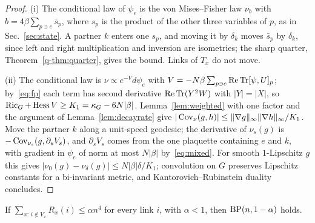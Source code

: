 \begin{proof}
(i) The conditional law of $\psi_e$ is the von Mises--Fisher law $\nu_b$ with
$b=4\beta\sum_{p\ni e}\bar s_p$, where $s_p$ is the product of the other three
variables of $p$, as in Sec.~\ref{sec:state}. A partner $k$ enters one
$s_p$, and moving it by $\delta_k$ moves $\bar s_p$ by $\delta_k$, since left and
right multiplication and inversion are isometries; the sharp quarter,
Theorem~\ref{q-thm:quarter}, gives the bound. Links of $T_x$ do not move.

(ii) The conditional law is $\nu\propto e^{-V}d\psi_e$ with $V=-N\beta
\sum_{p\ni e}\operatorname{Re}\operatorname{Tr}[\psi,U]_p$; by~\eqref{eq:fp} each term has second
derivative $\operatorname{Re}\operatorname{Tr}(Y^2W)$ with $|Y|=|X|$, so $\operatorname{Ric}_G+\operatorname{Hess} V\ge K_1=
\kappa_G-6N|\beta|$. Lemma~\ref{lem:weighted} with one factor and the argument
of Lemma~\ref{lem:decayrate} give $|\operatorname{Cov}_\nu(g,h)|\le\|\nabla g\|_\infty
\|\nabla h\|_\infty/K_1$. Move the partner $k$ along a unit-speed geodesic; the
derivative of $\nu_s(g)$ is $-\operatorname{Cov}_{\nu_s}(g,\partial_sV_s)$, and $\partial_sV_s$
comes from the one plaquette containing $e$ and $k$, with gradient in $\psi_e$
of norm at most $N|\beta|$ by~\eqref{eq:mixed}. For smooth $1$-Lipschitz $g$
this gives $|\nu_0(g)-\nu_\delta(g)|\le N|\beta|\delta/K_1$; convolution on $G$
preserves Lipschitz constants for a bi-invariant metric, and
Kantorovich--Rubinstein duality concludes.
\end{proof}

\begin{proposition}\label{prop:interiorbp}
If $\sum_{x:\,i\notin V_x}R_x(i)\le\alpha n^4$ for every link $i$, with
$\alpha<1$, then $\mathrm{BP}(n,1-\alpha)$ holds.
\end{proposition}


